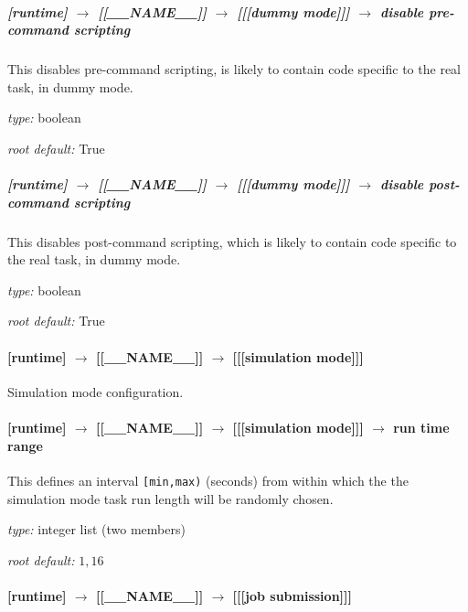 \subparagraph[disable pre-command scripting]{[runtime] $\rightarrow$ [[\_\_NAME\_\_]] $\rightarrow$ [[[dummy mode]]] $\rightarrow$ disable pre-command scripting}

This disables pre-command scripting, is likely to contain code specific
to the real task, in dummy mode. 

\begin{myitemize}
\item {\em type:} boolean
\item {\em root default:} True
\end{myitemize}

\subparagraph[disable post-command scripting]{[runtime] $\rightarrow$ [[\_\_NAME\_\_]] $\rightarrow$ [[[dummy mode]]] $\rightarrow$ disable post-command scripting}

This disables post-command scripting, which is likely to contain code
specific to the real task, in dummy mode. 

\begin{myitemize}
\item {\em type:} boolean
\item {\em root default:} True
\end{myitemize}

\paragraph[{[[[}simulation mode{]]]}]{[runtime] $\rightarrow$ [[\_\_NAME\_\_]] $\rightarrow$ [[[simulation mode]]]}

Simulation mode configuration.

\paragraph[run time range]{[runtime] $\rightarrow$ [[\_\_NAME\_\_]] $\rightarrow$ [[[simulation mode]]] $\rightarrow$ run time range}

This defines an interval \lstinline=[min,max)= (seconds) from within
which the the simulation mode task run length will be randomly chosen.

\begin{myitemize}
\item {\em type:} integer list (two members)
\item {\em root default:} $1,16$
\end{myitemize}

\paragraph[{[[[}job submission{]]]}]{[runtime] $\rightarrow$ [[\_\_NAME\_\_]] $\rightarrow$ [[[job submission]]]}


